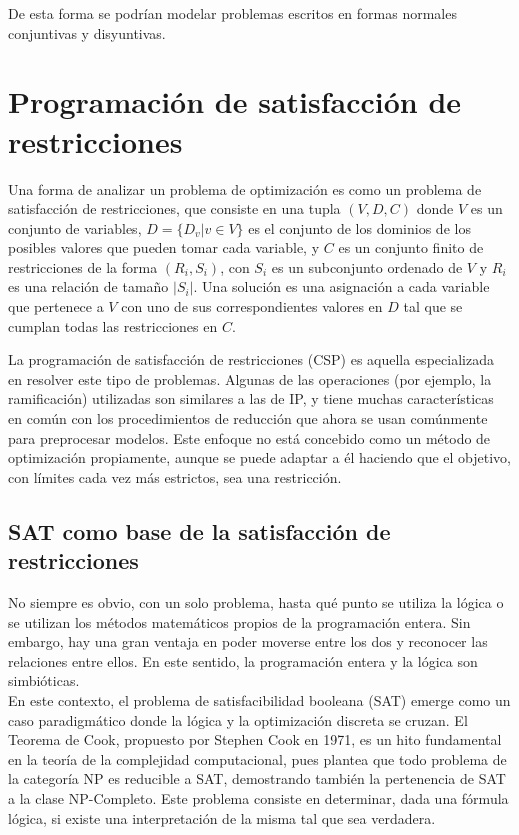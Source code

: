 \documentclass[12pt]{report}
\begin{document}
De esta forma se podrían modelar problemas escritos en formas normales conjuntivas y disyuntivas.

\section{Programación de satisfacción de restricciones}

Una forma de analizar un problema de optimización es como un problema de satisfacción de restricciones, que consiste en una tupla $(V,D,C)$ donde $V$ es un conjunto de variables, $D=\{D_v|v\in V\}$ es el conjunto de los dominios de los posibles valores que pueden tomar cada variable, y $C$ es un conjunto finito de restricciones de la forma $(R_i,S_i)$, con $S_i$ es un subconjunto ordenado de $V$ y $R_i$ es una relación de tamaño $|S_i|$. Una solución es una asignación a cada variable que pertenece a $V$ con uno de sus correspondientes valores en $D$ tal que se cumplan todas las restricciones en $C$.

La programación de satisfacción de restricciones (CSP) es aquella especializada en resolver este tipo de problemas. Algunas de las operaciones (por ejemplo, la ramificación) utilizadas son similares a las de IP, y tiene muchas características en común con los procedimientos de reducción que ahora se usan comúnmente para preprocesar modelos. Este enfoque no está concebido como un método de optimización propiamente, aunque se puede adaptar a él haciendo que el objetivo, con límites cada vez más estrictos, sea una restricción.

\subsection{SAT como base de la satisfacción de restricciones}

No siempre es obvio, con un solo problema, hasta qué punto se utiliza la lógica o se utilizan los métodos matemáticos propios de la programación entera. Sin embargo, hay una gran ventaja en poder moverse entre los dos y reconocer las relaciones entre ellos. En este sentido, la programación entera y la lógica son simbióticas.\\

En este contexto, el problema de satisfacibilidad booleana (SAT) emerge como un caso paradigmático donde la lógica y la optimización discreta se cruzan. El Teorema de Cook, propuesto por Stephen Cook en 1971, es un hito fundamental en la teoría de la complejidad computacional, pues plantea que todo problema de la categoría NP es reducible a SAT, demostrando también la pertenencia de SAT a la clase NP-Completo. Este problema consiste en determinar, dada una fórmula lógica, si existe una interpretación de la misma tal que sea verdadera.\\ 
\end{document}
